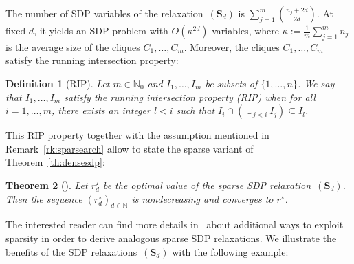 \documentclass[preprint]{sigplanconf}
\newcommand{\N}{\mathbb{N}}
\def\S{\mathbf{S}}
\def\S{\mathbf{S}}
\newtheorem{theorem}{Theorem}[section]
\theoremstyle{plain}
\newtheorem{definition}[theorem]{Definition}
\begin{document}
The number of SDP variables of the relaxation~$(\S_d)$ is $\sum_{j=1}^m \binom{n_j + 2 d}{2 d}$. At fixed $d$, it yields an SDP problem with $O(\kappa^{2d})$ variables, where $\kappa := \frac{1}{m} \sum_{j=1}^m n_j$ is the average size of the cliques $C_1, \dots, C_m$.
%
Moreover, the cliques $C_1, \dots, C_m$ satisfy the running intersection property: 
%
\begin{definition}[RIP]
\label{def:rip}
Let $m \in \N_0$  and $I_1, \dots, I_m$ be subsets of $\{1, \dots, n\}$. We say that $I_1, \dots, I_m$ satisfy the running intersection property (RIP) when for all $i=1, \dots, m$, there exists an integer $l < i$ such that $I_i \cap (\cup_{j < i} I_j) \subseteq I_l$.
\end{definition}
This RIP property together with the assumption mentioned in Remark~\ref{rk:sparsearch} allow to state the sparse variant of Theorem~\ref{th:densesdp}:
%
\begin{theorem}[]
\label{th:sparsesdp}
Let $r_d^{\star}$ be the optimal value of the sparse SDP relaxation~$(\S_d)$. Then the sequence $(r_d^{\star})_{d \in \N}$ is nondecreasing and converges to $r^\star$.
\end{theorem}
The interested reader can find more details in~\cite{Waki06SparseSOS} about additional ways to exploit sparsity in order to derive analogous sparse SDP relaxations.
We illustrate the benefits of the SDP relaxations~$(\S_d)$ with the following example:
\end{document}
